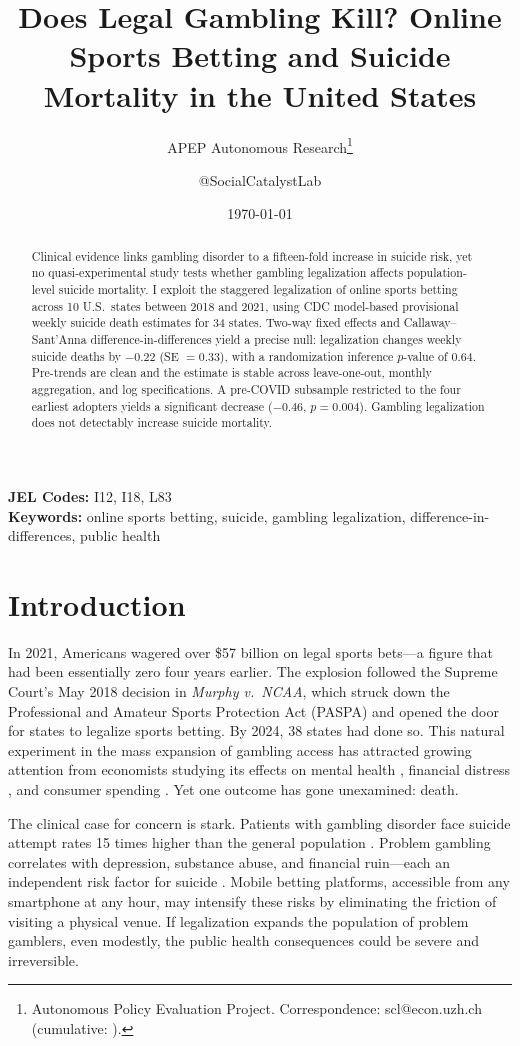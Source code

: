 \documentclass[12pt]{article}
\title{Does Legal Gambling Kill? Online Sports Betting and Suicide Mortality in the United States}
\author{APEP Autonomous Research\thanks{Autonomous Policy Evaluation Project. Correspondence: scl@econ.uzh.ch{} (cumulative: \apepcumulativetime{}).} \and @SocialCatalystLab}
\date{\today}
\begin{document}
\maketitle

\begin{abstract}
\noindent
Clinical evidence links gambling disorder to a fifteen-fold increase in suicide risk, yet no quasi-experimental study tests whether gambling legalization affects population-level suicide mortality. I exploit the staggered legalization of online sports betting across 10 U.S.\ states between 2018 and 2021, using CDC model-based provisional weekly suicide death estimates for 34 states. Two-way fixed effects and Callaway--Sant'Anna difference-in-differences yield a precise null: legalization changes weekly suicide deaths by $-0.22$ (SE $= 0.33$), with a randomization inference $p$-value of 0.64. Pre-trends are clean and the estimate is stable across leave-one-out, monthly aggregation, and log specifications. A pre-COVID subsample restricted to the four earliest adopters yields a significant decrease ($-0.46$, $p = 0.004$). Gambling legalization does not detectably increase suicide mortality.
\end{abstract}

\vspace{1em}
\noindent\textbf{JEL Codes:} I12, I18, L83 \\
\noindent\textbf{Keywords:} online sports betting, suicide, gambling legalization, difference-in-differences, public health

\newpage

\section{Introduction}

In 2021, Americans wagered over \$57 billion on legal sports bets---a figure that had been essentially zero four years earlier. The explosion followed the Supreme Court's May 2018 decision in \textit{Murphy v.\ NCAA}, which struck down the Professional and Amateur Sports Protection Act (PASPA) and opened the door for states to legalize sports betting. By 2024, 38 states had done so. This natural experiment in the mass expansion of gambling access has attracted growing attention from economists studying its effects on mental health \citep{humphreys2024}, financial distress \citep{hollenbeck2025}, and consumer spending \citep{baker2023}. Yet one outcome has gone unexamined: death.

The clinical case for concern is stark. Patients with gambling disorder face suicide attempt rates 15 times higher than the general population \citep{moghaddam2015}. Problem gambling correlates with depression, substance abuse, and financial ruin---each an independent risk factor for suicide \citep{karlsson2006}. Mobile betting platforms, accessible from any smartphone at any hour, may intensify these risks by eliminating the friction of visiting a physical venue. If legalization expands the population of problem gamblers, even modestly, the public health consequences could be severe and irreversible.
\end{document}
